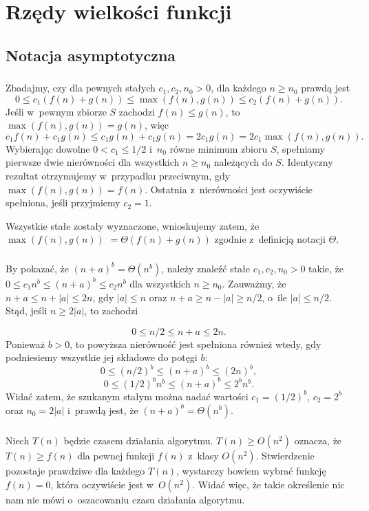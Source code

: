 \chapter{Rzędy wielkości funkcji}

\section{Notacja asymptotyczna}

\subsection{} %
Zbadajmy, czy dla pewnych stałych $c_1,c_2,n_0>0$, dla każdego $n\ge n_0$ prawdą jest
\[
	0\le c_1(f(n)+g(n))\le\max(f(n),g(n))\le c_2(f(n)+g(n)).
\]
Jeśli w~pewnym zbiorze $S$ zachodzi $f(n)\le g(n)$, to $\max(f(n), g(n)) = g(n)$, więc
\[
	c_1f(n)+c_1g(n)\le c_1g(n)+c_1g(n) = 2c_1g(n) = 2c_1\max(f(n), g(n)).
\]
Wybierając dowolne $0<c_1\le 1/2$ i~$n_0$ równe minimum zbioru $S$, spełniamy pierwsze dwie nierówności dla wszystkich $n\ge n_0$ należących do $S$. Identyczny rezultat otrzymujemy w~przypadku przeciwnym, gdy $\max(f(n), g(n)) = f(n)$. Ostatnia z~nierówności jest oczywiście spełniona, jeśli przyjmiemy $c_2=1$.

Wszystkie stałe zostały wyznaczone, wnioskujemy zatem, że $\max(f(n), g(n))$ $= \Theta(f(n)+g(n))$ zgodnie z~definicją notacji $\Theta$.

\subsection{} %
By pokazać, że $(n+a)^b=\Theta(n^b)$, należy znaleźć stałe $c_1,c_2,n_0>0$ takie, że $0\le c_1n^b\le (n+a)^b\le c_2n^b$ dla wszystkich $n\ge n_0$. Zauważmy, że $n+a\le n+|a|\le 2n$, gdy $|a|\le n$ oraz $n+a\ge n-|a|\ge n/2$, o~ile $|a|\le n/2$. Stąd, jeśli $n\ge 2|a|$, to zachodzi

\[
	0\le n/2\le n+a\le 2n.
\]
Ponieważ $b>0$, to powyższa nierówność jest spełniona również wtedy, gdy podniesiemy wszystkie jej składowe do potęgi $b$:
\[
	0\le (n/2)^b\le (n+a)^b\le (2n)^b,
\]
\[
	0\le (1/2)^bn^b\le (n+a)^b\le 2^bn^b.
\]
Widać zatem, że szukanym stałym można nadać wartości $c_1=(1/2)^b$, $c_2=2^b$ oraz $n_0=2|a|$ i~prawdą jest, że $(n+a)^b=\Theta(n^b)$.

\subsection{} %
Niech $T(n)$ będzie czasem działania algorytmu. $T(n)\ge O(n^2)$ oznacza, że $T(n)\ge f(n)$ dla pewnej funkcji $f(n)$ z~klasy $O(n^2)$. Stwierdzenie pozostaje prawdziwe dla każdego $T(n)$, wystarczy bowiem wybrać funkcję $f(n)=0$, która oczywiście jest w~$O(n^2)$. Widać więc, że takie określenie nic nam nie mówi o~oszacowaniu czasu działania algorytmu.

